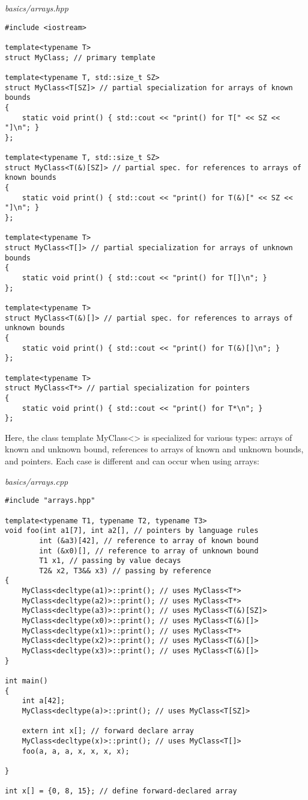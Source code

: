 \noindent
\textit{basics/arrays.hpp}
\begin{lstlisting}[style=styleCXX]
#include <iostream>

template<typename T>
struct MyClass; // primary template

template<typename T, std::size_t SZ>
struct MyClass<T[SZ]> // partial specialization for arrays of known bounds
{
	static void print() { std::cout << "print() for T[" << SZ << "]\n"; }
};

template<typename T, std::size_t SZ>
struct MyClass<T(&)[SZ]> // partial spec. for references to arrays of known bounds
{
	static void print() { std::cout << "print() for T(&)[" << SZ << "]\n"; }
};

template<typename T>
struct MyClass<T[]> // partial specialization for arrays of unknown bounds
{
	static void print() { std::cout << "print() for T[]\n"; }
};

template<typename T>
struct MyClass<T(&)[]> // partial spec. for references to arrays of unknown bounds
{
	static void print() { std::cout << "print() for T(&)[]\n"; }
};

template<typename T>
struct MyClass<T*> // partial specialization for pointers
{
	static void print() { std::cout << "print() for T*\n"; }
};
\end{lstlisting}

Here, the class template MyClass<> is specialized for various types: arrays of known and unknown bound, references to arrays of known and unknown bounds, and pointers. Each case is different and can occur when using arrays:

\noindent
\textit{basics/arrays.cpp}
\begin{lstlisting}[style=styleCXX]
#include "arrays.hpp"

template<typename T1, typename T2, typename T3>
void foo(int a1[7], int a2[], // pointers by language rules
		int (&a3)[42], // reference to array of known bound
		int (&x0)[], // reference to array of unknown bound
		T1 x1, // passing by value decays
		T2& x2, T3&& x3) // passing by reference
{
	MyClass<decltype(a1)>::print(); // uses MyClass<T*>
	MyClass<decltype(a2)>::print(); // uses MyClass<T*>
	MyClass<decltype(a3)>::print(); // uses MyClass<T(&)[SZ]>
	MyClass<decltype(x0)>::print(); // uses MyClass<T(&)[]>
	MyClass<decltype(x1)>::print(); // uses MyClass<T*>
	MyClass<decltype(x2)>::print(); // uses MyClass<T(&)[]>
	MyClass<decltype(x3)>::print(); // uses MyClass<T(&)[]>
}

int main()
{
	int a[42];
	MyClass<decltype(a)>::print(); // uses MyClass<T[SZ]>
	
	extern int x[]; // forward declare array
	MyClass<decltype(x)>::print(); // uses MyClass<T[]>
	foo(a, a, a, x, x, x, x);
	
}

int x[] = {0, 8, 15}; // define forward-declared array
\end{lstlisting}

